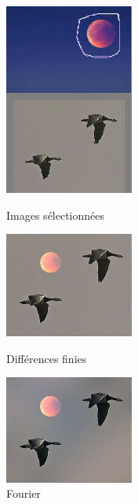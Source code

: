 \begin{figure}[!htb]
   \begin{minipage}{0.33\textwidth}
     \centering
     \includegraphics[width = 120pt]{Images/Resultats/LuneOiseau.png}
     \caption{Images sélectionnées}
      \end{minipage}\hfill
   \begin{minipage}{0.33\textwidth}
     \centering
     \includegraphics[width = 120pt]{Images/Resultats/LuneOiseauD.png}
     \caption{Différences finies}
      \end{minipage}\hfill
   \begin{minipage}{0.33\textwidth}
     \centering
     \includegraphics[width= 120pt]{Images/Resultats/LuneOiseauF.png}
     \caption{Fourier}
   \end{minipage}
\end{figure}


